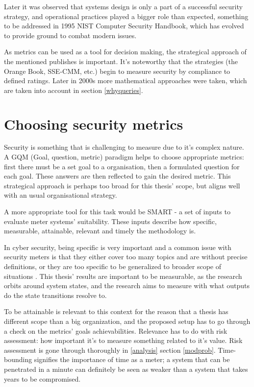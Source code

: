 Later it was observed that systems design is only a part of a
successful security strategy, and operational practices played a
bigger role than expected, something to be addressed in 1995 NIST
Computer Security Handbook, which has evolved to provide ground to
combat modern issues. \cite{bayuk2013measuring}

As metrics can be used as a tool for decision making, the strategical
approach of the mentioned publishes is important. It's noteworthy that
the strategies (the Orange Book, SSE-CMM, etc.) begin to measure
security by compliance to defined ratings. Later in 2000s more
mathematical approaches were taken, which are taken into account in
section \ref{whyqueries}. \cite{bayuk2013measuring}

\section{Choosing security metrics} \label{choosingsecmet}

Security is something that is challenging to measure due to it's
complex nature. A GQM (Goal, question, metric) paradigm helps to
choose appropriate metrics: first there must be a set goal to a
organisation, then a formulated question for each goal. These answers
are then reflected to gain the desired metric. This strategical
approach is perhaps too broad for this thesis' scope, but aligns well
with an usual organisational strategy. \cite{papazov2019cybersecurity}

A more appropriate tool for this task would be SMART - a set of inputs
to evaluate meter systems' suitability. These inputs describe how
specific, measurable, attainable, relevant and timely the methodology
is. \cite{payne2006guide}

In cyber security, being specific is very important and a common issue
with security meters is that they either cover too many topics and are
without precise definitions, or they are too specific to be
generalized to broader scope of situations
\cite{wang2005information}. This thesis' results are important to be
measurable, as the research orbits around system states, and the
research aims to measure with what outputs do the state transitions
resolve to.

To be attainable is relevant to this context for the reason that a
thesis has different scope than a big organization, and the
proposed setup has to go through a check on the metrics' goals
achievabilities. Relevance has to do with risk assessment: how important
it's to measure something related to it's value. Risk assessment is
gone through thoroughly in \ref{analysis} section
\ref{modprob}. Time-bounding signifies the importance of time as a
meter; a system that can be penetrated in a minute can definitely be
seen as weaker than a system that takes years to be compromised.


